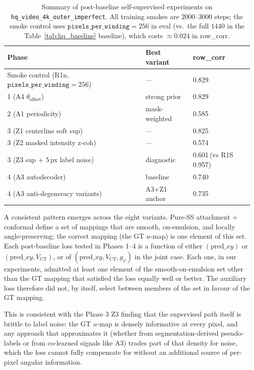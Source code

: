 \documentclass[11pt,a4paper]{article}
\begin{document}
\begin{table}[H]
\centering
\small
\begin{tabular}{lll}
\toprule
Phase & Best variant & row\_corr \\
\midrule
Smoke control (R1n, $\texttt{pixels\_per\_winding} = 256$) & --- & 0.829 \\
1 (A4 \(\theta_{\mathrm{offset}}\)) & strong prior & 0.829 \\
2 (A1 periodicity) & mask-weighted & 0.585 \\
3 (Z1 centerline soft sup) & --- & 0.825 \\
3 (Z2 masked intensity z-coh) & --- & 0.574 \\
3 (Z3 sup + $5$\,px label noise) & diagnostic & 0.601\,(vs R1S 0.957) \\
4 (A3 autodecoder) & baseline & 0.740 \\
4 (A3 anti-degeneracy variants) & A3+Z1 anchor & 0.735 \\
\bottomrule
\end{tabular}
\caption{Summary of post-baseline self-supervised experiments on \texttt{hq\_video\_4k\_outer\_imperfect}. All training smokes are $2000$--$3000$ steps; the smoke control uses $\texttt{pixels\_per\_winding} = 256$ in eval (vs.\ the full $1440$ in the Table~\ref{tab:hq_baseline} baseline), which costs $\approx 0.024$ in row\_corr.}
\label{tab:post_baseline_summary}
\end{table}

A consistent pattern emerges across the eight variants. Pure-SS attachment $+$ conformal define a set of mappings that are smooth, on-emulsion, and locally angle-preserving; the correct mapping (the GT $u$-map) is one element of this set. Each post-baseline loss tested in Phases 1--4 is a function of either $(\mathrm{pred}\_xy)$ or $(\mathrm{pred}\_xy, V_{\mathrm{CT}})$, or of $(\mathrm{pred}\_xy, V_{\mathrm{CT}}, g_\varphi)$ in the joint case. Each one, in our experiments, admitted at least one element of the smooth-on-emulsion set other than the GT mapping that satisfied the loss equally well or better. The auxiliary loss therefore did not, by itself, select between members of the set in favour of the GT mapping.

This is consistent with the Phase 3 Z3 finding that the supervised path itself is brittle to label noise: the GT $u$-map is densely informative at every pixel, and any approach that approximates it (whether from segmentation-derived pseudo-labels or from co-learned signals like A3) trades part of that density for noise, which the loss cannot fully compensate for without an additional source of per-pixel angular information.
\end{document}
